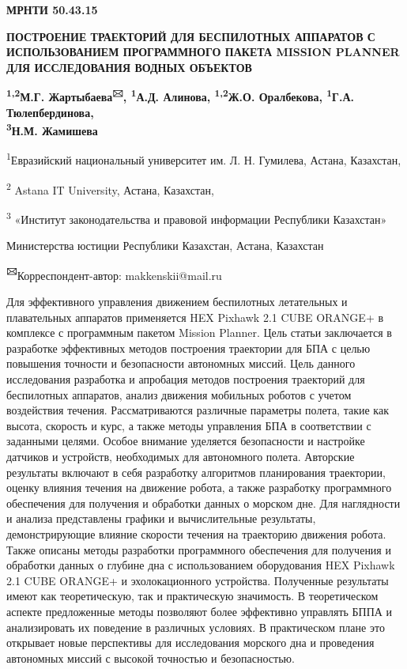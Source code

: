 
\newpage
{\bfseries МРНТИ 50.43.15}

{\bfseries ПОСТРОЕНИЕ ТРАЕКТОРИЙ ДЛЯ БЕСПИЛОТНЫХ АППАРАТОВ С ИСПОЛЬЗОВАНИЕМ
ПРОГРАММНОГО ПАКЕТА MISSION PLANNER ДЛЯ ИССЛЕДОВАНИЯ ВОДНЫХ ОБЪЕКТОВ}

{\bfseries \textsuperscript{1,2}М.Г. Жартыбаева\textsuperscript{🖂},
\textsuperscript{1}А.Д. Алинова, \textsuperscript{1,2}Ж.О. Оралбекова,
\textsuperscript{1}Г.А. Тюлепбердинова,\\
\textsuperscript{3}Н.М. Жамишева}

\textsuperscript{1}Евразийский национальный университет им. Л. Н.
Гумилева, Астана, Казахстан,

\textsuperscript{2} Astana IT University, Астана, Казахстан,

\textsuperscript{3} «Институт законодательства и правовой информации
Республики Казахстан»

Министерства юстиции Республики Казахстан, Астана, Казахстан

{\bfseries \textsuperscript{🖂}}Корреспондент-автор: makkenskii@mail.ru

Для эффективного управления движением беспилотных летательных и
плавательных аппаратов применяется HEX Pixhawk 2.1 CUBE ORANGE+ в
комплексе с программным пакетом Mission Planner. Цель статьи заключается
в разработке эффективных методов построения траектории для БПА с целью
повышения точности и безопасности автономных миссий. Цель данного
исследования разработка и апробация методов построения траекторий для
беспилотных аппаратов, анализ движения мобильных роботов с учетом
воздействия течения. Рассматриваются различные параметры полета, такие
как высота, скорость и курс, а также методы управления БПА в
соответствии с заданными целями. Особое внимание уделяется безопасности
и настройке датчиков и устройств, необходимых для автономного полета.
Авторские результаты включают в себя разработку алгоритмов планирования
траектории, оценку влияния течения на движение робота, а также
разработку программного обеспечения для получения и обработки данных о
морском дне. Для наглядности и анализа представлены графики и
вычислительные результаты, демонстрирующие влияние скорости течения на
траекторию движения робота. Также описаны методы разработки программного
обеспечения для получения и обработки данных о глубине дна с
использованием оборудования HEX Pixhawk 2.1 CUBE ORANGE+ и
эхолокационного устройства. Полученные результаты имеют как
теоретическую, так и практическую значимость. В теоретическом аспекте
предложенные методы позволяют более эффективно управлять БППА и
анализировать их поведение в различных условиях. В практическом плане
это открывает новые перспективы для исследования морского дна и
проведения автономных миссий с высокой точностью и безопасностью.

